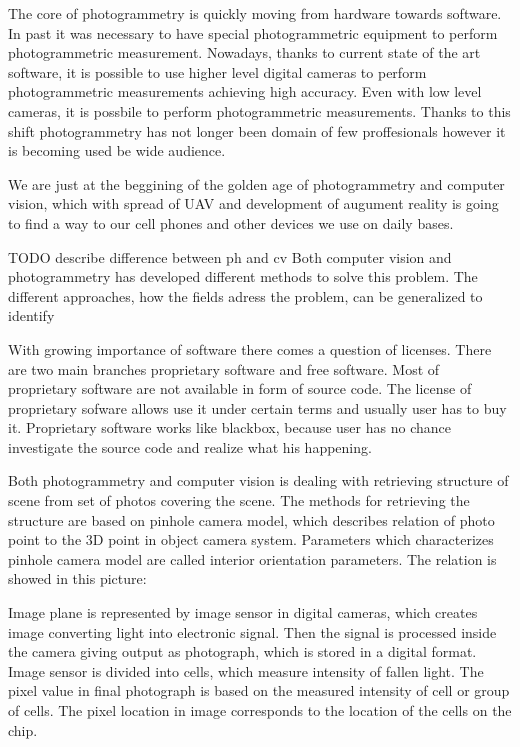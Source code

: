\documentclass[a4paper,12pt]{report}
\begin{document}
The core of photogrammetry is quickly moving  from  hardware towards software. In past it was necessary to have special 
photogrammetric equipment to perform photogrammetric measurement. Nowadays, thanks to current state of the art software, 
 it is possible to use higher level digital cameras to perform photogrammetric measurements achieving
high accuracy. Even with low level cameras, it is possbile to perform photogrammetric measurements. 
Thanks to this shift photogrammetry has not longer been domain of few proffesionals however it is 
becoming used be wide audience. 

We are just at the beggining of the golden age of photogrammetry and computer vision, 
which with spread of UAV and development of augument
reality is going to find a way to our cell phones and other devices we use on daily bases. 

TODO describe difference between ph and cv
Both computer vision and photogrammetry has developed different methods to solve this problem.
The different approaches, how the fields adress the problem, can be generalized to identify 


With growing importance of software there comes a question of licenses. There are two 
main branches proprietary software and free software. Most of proprietary software are not available in 
form of source code. The license of proprietary sofware allows use it under certain terms and usually user 
has to buy it. Proprietary software works like blackbox, because user has no chance investigate the source 
code and realize what his happening. 


Both photogrammetry and computer vision is dealing with retrieving structure of scene from set of photos 
covering the scene. The methods for retrieving the structure are based on pinhole camera model, which 
describes relation of photo point to the 3D point in object camera system.
Parameters which characterizes pinhole camera model are called interior orientation parameters.
The relation is showed in this picture:

Image plane is represented by image sensor in digital cameras, which  creates image converting light into electronic signal.
Then the signal is processed inside the camera giving output as photograph, which is stored in a digital format. 
Image sensor is divided into cells, which measure intensity of fallen light. The pixel value in final 
photograph is based on the measured intensity of cell or group of cells. The pixel location in image corresponds
to the location of the cells on the chip.
\end{document}
